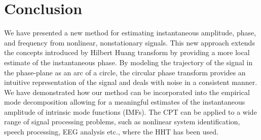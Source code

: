 \documentclass[11pt,draftcls,onecolumn]{IEEEtran}
\begin{document}

\section{Conclusion}\label{sect:ConclusionSection}
We have presented a new method for estimating instantaneous amplitude, phase, and frequency from nonlinear, nonstationary signals. This new approach extends the concepts introduced by Hilbert Huang transform by providing a more local estimate of the instantaneous phase. By modeling the trajectory of the signal in the phase-plane as an arc of a circle, the circular phase transform provides an intuitive representation of the signal and deals with noise in a consistent manner. We have demonstrated how our method can be incorporated into the empirical mode decomposition allowing for a meaningful estimates of the instantaneous amplitude of intrinsic mode functions (IMFs). The CPT can be applied to a wide range of signal processing problems, such as nonlinear system identification, speech processing, EEG analysis etc., where the HHT has been used. 


\end{document}
